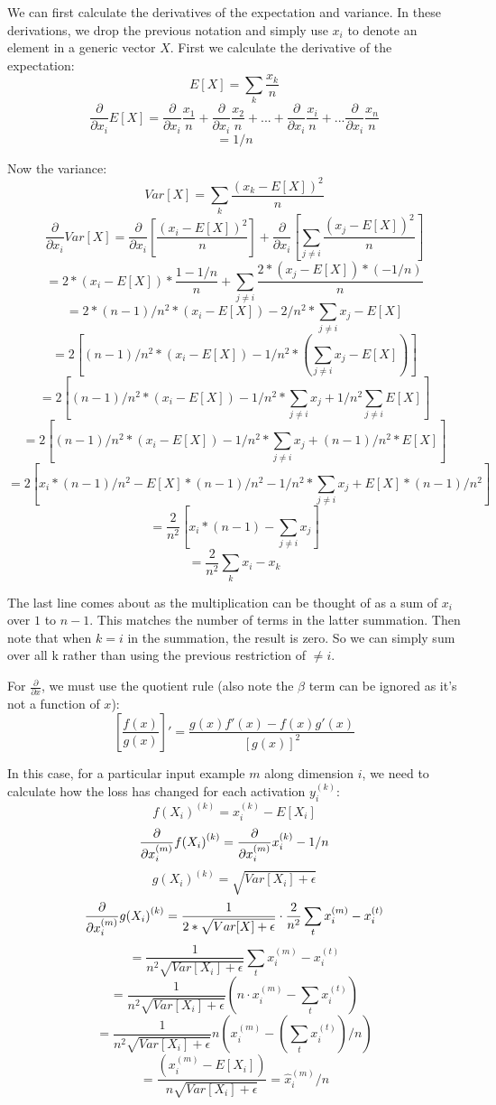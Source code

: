 \documentclass[]{article}
\newcommand{\derivop}[1]{%
	\ensuremath{\frac{\partial}{\partial {#1}}}}
\newcommand{\deriv}[2]{%
	\ensuremath{\frac{\partial {#1}}{\partial {#2}}}}
\newcommand{\slayer}[3]{ %
	\ensuremath{{#1}^{(#2)}_{#3}}}
\newcommand{\vlayer}[2]{ %
	\ensuremath{{#1}^{(#2)}}}
\begin{document}
We can first calculate the derivatives of the expectation and variance. In these derivations, we drop the previous notation and simply use $x_i$ to denote an element in a generic vector $X$.
First we calculate the derivative of the expectation:
$$E[X] = \sum_{k}\frac{x_k}{n}$$
$$\derivop{x_i}E[X] = \derivop{x_i}\frac{x_1}{n} + \derivop{x_i}\frac{x_2}{n} + ... + \derivop{x_i}\frac{x_i}{n} + ... \derivop{x_i} \frac{x_n}{n}$$
$$= 1/n$$

Now the variance:
$$Var[X] = \sum_{k} \frac{(x_k - E[X])^2}{n}$$
$$\derivop{x_i}Var[X] = \derivop{x_i}\left[ \frac{(x_i - E[X])^2}{n} \right] + \derivop{x_i}\left[ \sum_{j \neq i}\frac{(x_j - E[X])^2}{n} \right]$$
$$= 2 * (x_i - E[X]) * \frac{1 - 1/n}{n} + \sum_{j \neq i}\frac{2*(x_j - E[X]) * (-1/n)}{n}$$
$$ = 2 * (n-1)/n^2 * (x_i - E[X]) - 2/n^2 * \sum_{j \neq i} x_j - E[X]$$
$$ = 2 \left[(n-1)/n^2 * (x_i - E[X]) - 1/n^2 * \left(\sum_{j \neq i} x_j - E[X]\right)\right]$$
$$ = 2 \left[(n-1)/n^2 * (x_i - E[X]) - 1/n^2 * \sum_{j \neq i} x_j + 1/n^2 \sum_{j \neq i}E[X]\right]$$
$$ = 2 \left[(n-1)/n^2 * (x_i - E[X]) - 1/n^2 * \sum_{j \neq i} x_j + (n-1)/n^2 * E[X]\right]$$
$$ = 2 \left[x_i * (n-1)/n^2 - E[X] * (n-1)/n^2 - 1/n^2 * \sum_{j \neq i} x_j + E[X] * (n-1)/n^2\right]$$
$$ = \frac{2}{n^2}\left[x_i * (n-1) - \sum_{j \neq i} x_j \right]$$
$$ = \frac{2}{n^2}\sum_{k} x_i - x_k$$

The last line comes about as the multiplication can be thought of as a sum of $x_i$ over $1$ to $n-1$. This matches the number of terms in the latter summation. Then note that when $k=i$ in the summation, the result is zero. So we can simply sum over all k rather than using the previous restriction of $\neq i$. 

For $\derivop{x}$, we must use the quotient rule (also note the $\beta$ term can be ignored as it's not a function of $x$):
$$\left[\frac{f(x)}{g(x)}\right]' = \frac{g(x)f'(x) - f(x)g'(x)}{[g(x)]^2}$$

In this case, for a particular input example $m$ along dimension $i$, we need to calculate how the loss has changed for each activation $\slayer{y}{k}{i}$:
$$\vlayer{f(X_i)}{k} = \slayer{x}{k}{i} - E[X_i]$$
$$\derivop{\slayer{x}{m}{i}}\vlayer{f(X_i)}{k} = \derivop{\slayer{x}{m}{i}}\slayer{x}{k}{i} - 1/n$$
$$\vlayer{g(X_i)}{k} = \sqrt{Var[X_i] + \epsilon}$$
$$\derivop{\slayer{x}{m}{i}}\vlayer{g(X_i)}{k} = \frac{1}{2* \sqrt{Var[X] + \epsilon}} \cdot \frac{2}{n^2}\sum_{t} \slayer{x}{m}{i} - \slayer{x}{t}{i}$$
$$ = \frac{1}{n^2\sqrt{Var[X_i] + \epsilon}}\sum_{t} \slayer{x}{m}{i} - \slayer{x}{t}{i}$$
$$ = \frac{1}{n^2\sqrt{Var[X_i] + \epsilon}}(n \cdot \slayer{x}{m}{i} - \sum_{t}\slayer{x}{t}{i})$$
$$ = \frac{1}{n^2\sqrt{Var[X_i] + \epsilon}}n(\slayer{x}{m}{i} - (\sum_{t}\slayer{x}{t}{i})/n)$$
$$ = \frac{(\slayer{x}{m}{i} - E[X_i])}{n\sqrt{Var[X_i] + \epsilon}} = \slayer{\hat{x}}{m}{i}/n$$
\end{document}
